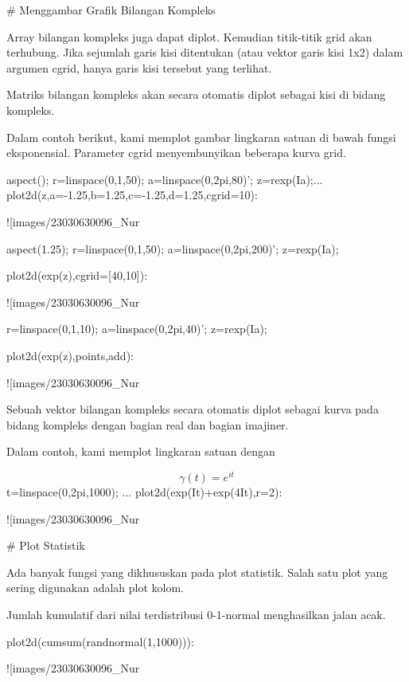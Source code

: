\documentclass{article}
\begin{document}
# Menggambar Grafik Bilangan Kompleks

Array bilangan kompleks juga dapat diplot. Kemudian titik-titik grid
akan terhubung. Jika sejumlah garis kisi ditentukan (atau vektor garis
kisi 1x2) dalam argumen cgrid, hanya garis kisi tersebut yang
terlihat.


Matriks bilangan kompleks akan secara otomatis diplot sebagai kisi di
bidang kompleks.


Dalam contoh berikut, kami memplot gambar lingkaran satuan di bawah
fungsi eksponensial. Parameter cgrid menyembunyikan beberapa kurva
grid.


\>aspect(); r=linspace(0,1,50); a=linspace(0,2pi,80)'; z=r\*exp(I\*a);...  
\>   plot2d(z,a=-1.25,b=1.25,c=-1.25,d=1.25,cgrid=10):


![images/23030630096_Nur%

\>aspect(1.25); r=linspace(0,1,50); a=linspace(0,2pi,200)'; z=r\*exp(I\*a);

\>plot2d(exp(z),cgrid=[40,10]):


![images/23030630096_Nur%

\>r=linspace(0,1,10); a=linspace(0,2pi,40)'; z=r\*exp(I\*a);

\>plot2d(exp(z),\>points,\>add):


![images/23030630096_Nur%

Sebuah vektor bilangan kompleks secara otomatis diplot sebagai kurva
pada bidang kompleks dengan bagian real dan bagian imajiner.


Dalam contoh, kami memplot lingkaran satuan dengan


$$\gamma(t) = e^{it}$$\>t=linspace(0,2pi,1000); ...  
\>   plot2d(exp(I\*t)+exp(4\*I\*t),r=2):


![images/23030630096_Nur%

# Plot Statistik

Ada banyak fungsi yang dikhususkan pada plot statistik. Salah satu
plot yang sering digunakan adalah plot kolom.


Jumlah kumulatif dari nilai terdistribusi 0-1-normal menghasilkan
jalan acak.


\>plot2d(cumsum(randnormal(1,1000))):


![images/23030630096_Nur%
\end{document}
